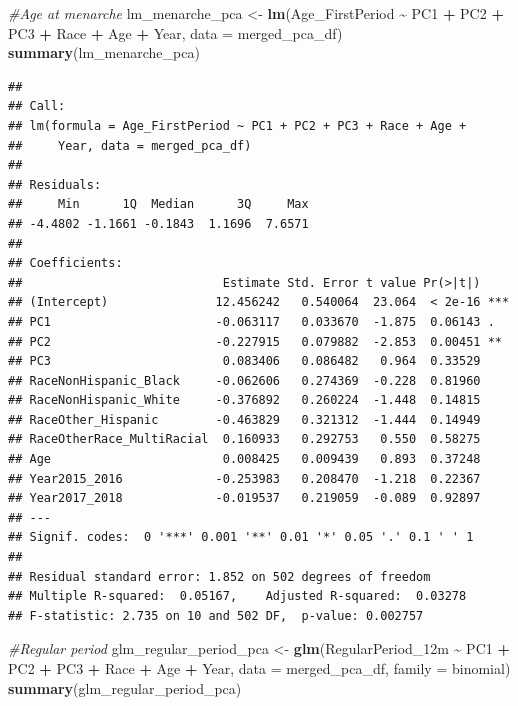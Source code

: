 \documentclass[
]{article}
\newenvironment{Shaded}{\begin{snugshade}}{\end{snugshade}}
\newcommand{\AttributeTok}[1]{\textcolor[rgb]{0.13,0.29,0.53}{#1}}
\newcommand{\CommentTok}[1]{\textcolor[rgb]{0.56,0.35,0.01}{\textit{#1}}}
\newcommand{\FunctionTok}[1]{\textcolor[rgb]{0.13,0.29,0.53}{\textbf{#1}}}
\newcommand{\NormalTok}[1]{#1}
\newcommand{\OtherTok}[1]{\textcolor[rgb]{0.56,0.35,0.01}{#1}}
\newcommand{\SpecialCharTok}[1]{\textcolor[rgb]{0.81,0.36,0.00}{\textbf{#1}}}
\begin{document}
\begin{Shaded}
\begin{Highlighting}[]
\CommentTok{\#Age at menarche}
\NormalTok{lm\_menarche\_pca }\OtherTok{\textless{}{-}} \FunctionTok{lm}\NormalTok{(Age\_FirstPeriod }\SpecialCharTok{\textasciitilde{}}\NormalTok{ PC1 }\SpecialCharTok{+}\NormalTok{ PC2 }\SpecialCharTok{+}\NormalTok{ PC3 }\SpecialCharTok{+}\NormalTok{ Race }\SpecialCharTok{+}\NormalTok{ Age }\SpecialCharTok{+}\NormalTok{ Year, }
                                \AttributeTok{data =}\NormalTok{ merged\_pca\_df)}
\FunctionTok{summary}\NormalTok{(lm\_menarche\_pca)}
\end{Highlighting}
\end{Shaded}

\begin{verbatim}
## 
## Call:
## lm(formula = Age_FirstPeriod ~ PC1 + PC2 + PC3 + Race + Age + 
##     Year, data = merged_pca_df)
## 
## Residuals:
##     Min      1Q  Median      3Q     Max 
## -4.4802 -1.1661 -0.1843  1.1696  7.6571 
## 
## Coefficients:
##                            Estimate Std. Error t value Pr(>|t|)    
## (Intercept)               12.456242   0.540064  23.064  < 2e-16 ***
## PC1                       -0.063117   0.033670  -1.875  0.06143 .  
## PC2                       -0.227915   0.079882  -2.853  0.00451 ** 
## PC3                        0.083406   0.086482   0.964  0.33529    
## RaceNonHispanic_Black     -0.062606   0.274369  -0.228  0.81960    
## RaceNonHispanic_White     -0.376892   0.260224  -1.448  0.14815    
## RaceOther_Hispanic        -0.463829   0.321312  -1.444  0.14949    
## RaceOtherRace_MultiRacial  0.160933   0.292753   0.550  0.58275    
## Age                        0.008425   0.009439   0.893  0.37248    
## Year2015_2016             -0.253983   0.208470  -1.218  0.22367    
## Year2017_2018             -0.019537   0.219059  -0.089  0.92897    
## ---
## Signif. codes:  0 '***' 0.001 '**' 0.01 '*' 0.05 '.' 0.1 ' ' 1
## 
## Residual standard error: 1.852 on 502 degrees of freedom
## Multiple R-squared:  0.05167,    Adjusted R-squared:  0.03278 
## F-statistic: 2.735 on 10 and 502 DF,  p-value: 0.002757
\end{verbatim}

\begin{Shaded}
\begin{Highlighting}[]
\CommentTok{\#Regular period }
\NormalTok{glm\_regular\_period\_pca }\OtherTok{\textless{}{-}} \FunctionTok{glm}\NormalTok{(RegularPeriod\_12m }\SpecialCharTok{\textasciitilde{}}\NormalTok{ PC1 }\SpecialCharTok{+}\NormalTok{ PC2 }\SpecialCharTok{+}\NormalTok{ PC3 }\SpecialCharTok{+}\NormalTok{ Race }\SpecialCharTok{+}\NormalTok{ Age }\SpecialCharTok{+}\NormalTok{ Year, }
                                \AttributeTok{data =}\NormalTok{ merged\_pca\_df, }\AttributeTok{family =}\NormalTok{ binomial)}
\FunctionTok{summary}\NormalTok{(glm\_regular\_period\_pca)}
\end{Highlighting}
\end{Shaded}
\end{document}
